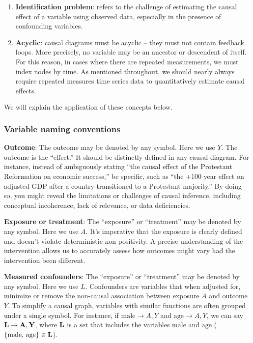 \documentclass[
  singlecolumn]{report}
\begin{document}
\begin{enumerate}
\def\labelenumi{\arabic{enumi}.}
\setcounter{enumi}{9}
\item
  \textbf{Identification problem}: refers to the challenge of estimating
  the causal effect of a variable using observed data, especially in the
  presence of confounding variables.
\item
  \textbf{Acyclic}: causal diagrams must be acyclic -- they must not
  contain feedback loops. More precisely, no variable may be an ancestor
  or descendent of itself. For this reason, in cases where there are
  repeated measurements, we must index nodes by time. As mentioned
  throughout, we should nearly always require repeated measures time
  series data to quantitatively estimate causal effects.
\end{enumerate}

We will explain the application of these concepts below.

\hypertarget{variable-naming-conventions}{%
\subsubsection{Variable naming
conventions}\label{variable-naming-conventions}}

\textbf{Outcome}: The outcome may be denoted by any symbol. Here we use
\(Y\). The outcome is the ``effect.'' It should be distinctly defined in
any causal diagram. For instance, instead of ambiguously stating ``the
causal effect of the Protestant Reformation on economic success,'' be
specific, such as ``the +100 year effect on adjusted GDP after a country
transitioned to a Protestant majority.'' By doing so, you might reveal
the limitations or challenges of causal inference, including conceptual
incoherence, lack of relevance, or data deficiencies.

\textbf{Exposure or treatment}: The ``exposure'' or ``treatment'' may be
denoted by any symbol. Here we use \(A\). It's imperative that the
exposure is clearly defined and doesn't violate deterministic
non-positivity. A precise understanding of the intervention allows us to
accurately assess how outcomes might vary had the intervention been
different.

\textbf{Measured confounders}: The ``exposure'' or ``treatment'' may be
denoted by any symbol. Here we use \(L\). Confounders are variables that
when adjusted for, minimize or remove the non-causal association between
exposure \(A\) and outcome \(Y\). To simplify a causal graph, variables
with similar functions are often grouped under a single symbol. For
instance, if \(\text{male} \to A, Y\) and \(\text{age} \to A, Y\), we
can say \(\bf{L} \to A, Y\), where \(\bf{L}\) is a set that includes the
variables \(\text{male}\) and \(\text{age}\)
(\(\{\text{male, age}\}\in \bf{L}\)).
\end{document}
